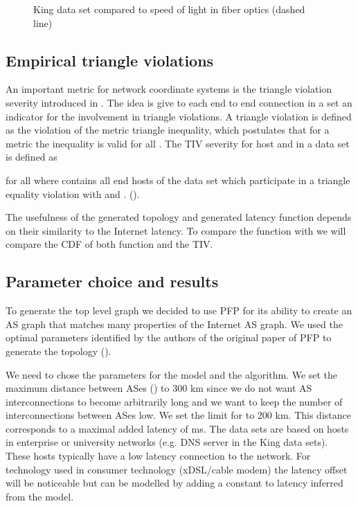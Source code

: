\documentclass{sig-alternate-10pt}
\begin{document}
\begin{enumerate}
\begin{figure}
\caption{King data set compared to speed of light in fiber optics (dashed line)} 
\label{kingscatterfig}
\end{figure}

\subsection{Empirical triangle violations}
\label{sec:empir-triangle-viol}

An important metric for network coordinate systems is the triangle violation severity introduced in \cite{Wang2007a}. The idea is give to each end to end connection  in a set  an indicator for the involvement in triangle violations. A triangle violation is defined as the violation of the metric triangle inequality, which postulates that for a metric  the inequality  is valid for all . The TIV severity for host  and  in a data set is defined as



\noindent for all  where  contains all end hosts  of the data set which participate in a triangle equality violation with  and . ().

The usefulness of the generated topology  and generated latency function  depends on their similarity to the Internet latency. To compare the function  with  we will compare the CDF of both function and the TIV. 

\subsection{Parameter choice and results}
\label{sec:param-choice-results}

To generate the top level graph  we decided to use PFP \cite{pfp} for its ability to create an AS graph that matches many properties of the Internet AS graph. We used the optimal parameters identified by the authors of the original paper of  PFP to generate the topology  (). 

We need to chose the parameters for the model and the algorithm. 
We set the maximum distance between ASes () to 300 km since we do not want AS interconnections to become arbitrarily long and we want to keep the number of interconnections between ASes low. 
We set the limit for  to 200 km. This distance corresponds to a maximal added latency of  ms.  The data sets are based on hosts in enterprise or university networks (e.g. DNS server in the King data sets). These hosts typically have a low latency connection to the network. For technology used in consumer technology (xDSL/cable modem) the latency offset will be noticeable but can be modelled by adding a constant to latency inferred from the model.



\end{enumerate}
\end{document}
